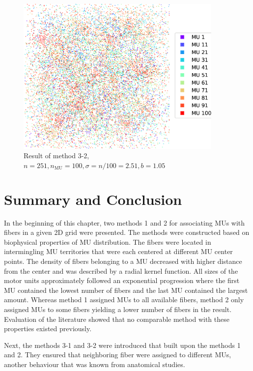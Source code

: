 \begin{figure}%
  \centering
  \includegraphics[width=0.9\textwidth]{images/motor_unit_assignment/MU_fibre_distribution_combined_sparse_251x251_100_2d_fiber_distribution_.png}%
  \caption{Result of method 3-2, $n=251, n_\text{MU}=100, \sigma = n/100 = 2.51, b=1.05$}%
  \label{fig:mu_method3_2}%
\end{figure}%

\section{Summary and Conclusion}\label{sec:mu_conclusion}
In the beginning of this chapter, two methods 1 and 2 for associating MUs with fibers in a given 2D grid were presented. The methods were constructed based on biophysical properties of MU distribution. The fibers were located in intermingling MU territories that were each centered at different MU center points.
The density of fibers belonging to a MU decreased with higher distance from the center and was described by a radial kernel function.
All sizes of the motor units approximately followed an exponential progression where the first MU contained the lowest number of fibers and the last MU contained the largest amount. 
Whereas method 1 assigned MUs to all available fibers, method 2 only assigned MUs to some fibers yielding a lower number of fibers in the result.
Evaluation of the literature showed that no comparable method with these properties existed previously.

Next, the methods 3-1 and 3-2 were introduced that built upon the methods 1 and 2. They ensured that neighboring fiber were assigned to different MUs, another behaviour that was known from anatomical studies.

